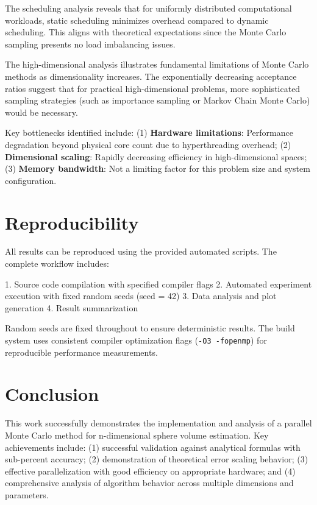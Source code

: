 \documentclass[11pt,a4paper]{article}
\begin{document}
	The scheduling analysis reveals that for uniformly distributed computational workloads, static scheduling minimizes overhead compared to dynamic scheduling. This aligns with theoretical expectations since the Monte Carlo sampling presents no load imbalancing issues.
	
	The high-dimensional analysis illustrates fundamental limitations of Monte Carlo methods as dimensionality increases. The exponentially decreasing acceptance ratios suggest that for practical high-dimensional problems, more sophisticated sampling strategies (such as importance sampling or Markov Chain Monte Carlo) would be necessary.
	
	Key bottlenecks identified include: (1) \textbf{Hardware limitations}: Performance degradation beyond physical core count due to hyperthreading overhead; (2) \textbf{Dimensional scaling}: Rapidly decreasing efficiency in high-dimensional spaces; (3) \textbf{Memory bandwidth}: Not a limiting factor for this problem size and system configuration.
	
	\section{Reproducibility}
	
	All results can be reproduced using the provided automated scripts. The complete workflow includes:
	
	1. Source code compilation with specified compiler flags
	2. Automated experiment execution with fixed random seeds (seed = 42)
	3. Data analysis and plot generation
	4. Result summarization
	
	Random seeds are fixed throughout to ensure deterministic results. The build system uses consistent compiler optimization flags (\texttt{-O3 -fopenmp}) for reproducible performance measurements.
	
	\section{Conclusion}
	
	This work successfully demonstrates the implementation and analysis of a parallel Monte Carlo method for n-dimensional sphere volume estimation. Key achievements include: (1) successful validation against analytical formulas with sub-percent accuracy; (2) demonstration of theoretical error scaling behavior; (3) effective parallelization with good efficiency on appropriate hardware; and (4) comprehensive analysis of algorithm behavior across multiple dimensions and parameters.
	
\end{document}
